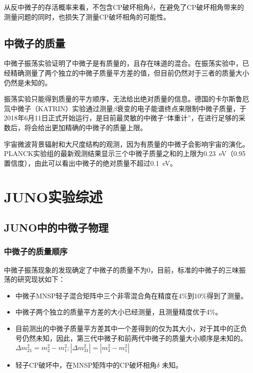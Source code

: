 \documentclass[10pt,a4paper]{article}
\begin{document}
从反中微子的存活概率来看，不包含CP破坏相角$\delta$，在避免了CP破坏相角带来的测量问题的同时，也损失了测量CP破坏相角的可能性。

\newpage
\subsection{中微子的质量}\label{sub:1}

中微子振荡实验证明了中微子是有质量的，且存在味道的混合。在振荡实验中，已经精确测量了两个独立的中微子质量平方差的值，但目前仍然对于三者的质量大小仍然是未知的。


振荡实验只能得到质量的平方顺序，无法给出绝对质量的信息。德国的卡尔斯鲁厄氚中微子（KATRIN）实验通过测量$\beta$衰变的电子能谱终点来限制中微子质量，于2018年6月11日正式开始运行，是目前最灵敏的中微子“体重计”，在进行足够的采数后，将会给出更加精确的中微子的质量上限。

宇宙微波背景辐射和大尺度结构的观测，因为有质量的中微子会影响宇宙的演化。PLANCK实验组的最新观测结果显示三个中微子质量之和的上限为\SI{0.23}{eV}（0.95置信度），由此可以看出中微子的绝对质量不超过\SI{0.1}{eV}\cite{plank}。

\newpage
\section{JUNO实验综述} \label{sysdes1}%

\subsection{JUNO中的中微子物理}\label{sub:2}
\subsubsection{中微子的质量顺序}\label{sub:3}

中微子振荡现象的发现确定了中微子的质量不为0，目前，标准的中微子的三味振荡的研究现状如下\cite{2016Neutrino}：
\begin{itemize}
	\item{中微子MNSP轻子混合矩阵中三个非零混合角在精度在4\%到10\%得到了测量。}
    \item{中微子两个独立的质量平方差的大小已经测量，且测量精度优于4\%。}
    \item{目前测出的中微子质量平方差其中一个差得到的仅为其大小，对于其中的正负号仍然未知，因此，第三代中微子和前两代中微子的质量大小顺序是未知的。$\Delta m_{21}^2=m_{2}^2-m_{1}^2;|\Delta m_{31}^2|=|m_{3}^2-m_{1}^2|$}
    \item{轻子CP破坏中，在MNSP矩阵中的CP破坏相角$\delta$ 未知。}
\end{itemize}
\end{document}
